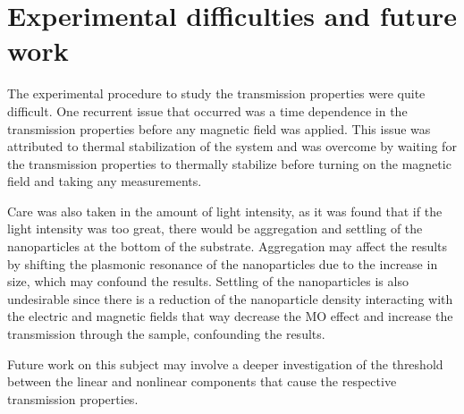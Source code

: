 \section{Experimental difficulties and future work}
The experimental procedure to study the transmission properties were quite difficult. One recurrent issue that occurred was a time dependence in the transmission properties before any magnetic field was applied. This issue was attributed to thermal stabilization of the system and was overcome by waiting for the transmission properties to thermally stabilize before turning on the magnetic field and taking any measurements.

Care was also taken in the amount of light intensity, as it was found that if the light intensity was too great, there would be aggregation and settling of the nanoparticles at the bottom of the substrate. Aggregation may affect the results by shifting the plasmonic resonance of the nanoparticles due to the increase in size, which may confound the results. Settling of the nanoparticles is also undesirable since there is a reduction of the nanoparticle density interacting with the electric and magnetic fields that way decrease the MO effect and increase the transmission through the sample, confounding the results.

Future work on this subject may involve a deeper investigation of the threshold between the linear and nonlinear components that cause the respective transmission properties.